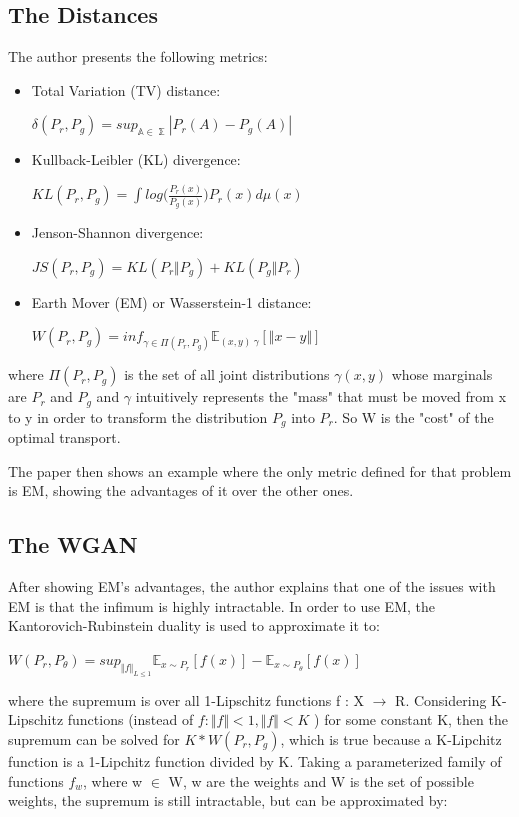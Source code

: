 \subsection{The Distances}
The author presents the following metrics:
\begin{itemize}
	\item Total Variation (TV) distance:
	\begin{center}
		$\delta(P_{r}, P_{g}) = sup_{\mathbb{A \in \sum}}|P_{r}(A)-P_{g}(A)| $
	\end{center}
	\item Kullback-Leibler (KL) divergence:
	\begin{center}
		$KL(P_{r}, P_{g}) = \int log \Big(\frac{P_{r}(x)}{P_{g}(x)}\Big) P_{r}(x) d\mu(x) $
	\end{center}
	\item Jenson-Shannon divergence:
	\begin{center}
		$ JS(P_{r}, P_{g}) = KL(P_{r} \Vert P_{g}) + KL(P_{g} \Vert P_{r}) $
	\end{center}
	\item Earth Mover (EM) or Wasserstein-1 distance:
	\begin{center}
		$ W(P_{r}, P_{g}) = inf_{\gamma \in \Pi(P_{r},P_{g})} \mathbb{E}_{(x,y)~\gamma}[\Vert x - y \Vert]$
	\end{center}
	
\end{itemize}

where $\Pi(P_{r}, P_{g})$ is the set of all joint distributions $\gamma(x,y)$ whose marginals are $P_{r}$ and $P_{g}$ and $\gamma$ intuitively represents the "mass" that must be moved from x to y in order to transform the distribution  $P_{g}$ into $P_{r}$. So W is the "cost" of the optimal transport.

The paper then shows an example where the only metric defined for that problem is EM, showing the advantages of it over the other ones.
\subsection{The WGAN}
After showing EM's advantages, the author explains that one of the issues with EM is that the infimum is highly intractable. In order to use EM, the Kantorovich-Rubinstein duality is used to approximate it to:
\begin{center}
	$W(P_{r},P_{\theta}) = sup_{\Vert f \Vert_{L \leq 1}} \mathbb{E}_{x \sim P_{r}}[f(x)] - \mathbb{E}_{x \sim P_{\theta}}[f(x)] $
\end{center}
where the supremum is over all 1-Lipschitz functions f : X $\rightarrow$ R. Considering K-Lipschitz functions (instead of $f : \Vert f \Vert < 1, \Vert f \Vert < K$ ) for some constant K, then the supremum can be solved  for $K*W(P_{r}, P_{g})$, which is true because a K-Lipchitz function is a 1-Lipchitz function divided by K. Taking a parameterized family of  functions $f_{w}$, where w $\in$ W, w are the weights and W is the set of possible weights,  the supremum is still intractable, but can be approximated by:

